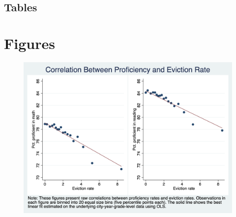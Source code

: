 \documentclass[12pt]{article}
\begin{document}
\singlespacing
\setlength\bibsep{0pt}





\clearpage

\onehalfspacing


\begin{landscape}
\section*{Tables} \label{sec:tab}

\end{landscape}





\clearpage

\section*{Figures} \label{sec:fig}

\begin{figure}[H]
    \centering
    \includegraphics[scale=0.4]{output/graphs/outcome_binscatter.png}
    \caption{}
    \label{fig:my_label}
\end{figure}
\end{document}
